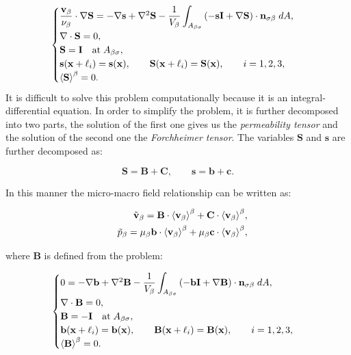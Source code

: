 \begin{eqnarray}
	\begin{cases}
		\dfrac{\textbf{v}_{\beta}}{\nu_{\beta}} \cdot  \nabla \mathbf{S} = -\nabla \mathbf{s} + \nabla^2 \mathbf{S} - \dfrac{1}{V_\beta} \displaystyle \int_{A_{\beta \sigma}} \left(-\mathbf{s}\mathbf{I}  +  \nabla \mathbf{S} \right) \cdot \mathbf{n}_{\sigma \beta} \;dA,  \\
		\nabla \cdot \mathbf{S} = 0, \\
		\mathbf{S} = \mathbf{I} \quad \textrm{at} \; A_{\beta \sigma}, \\
		\mathbf{s}(\mathbf{x} +\ell_i) = \mathbf{s}(\mathbf{x}), \qquad \mathbf{S}(\mathbf{x} +\ell_i) = \mathbf{S}(\mathbf{x}), \qquad i=1,2,3 ,\\
		{\left< \mathbf{S} \right>}^{\beta} = 0.
	\end{cases}
\label{eq:R_problem}
\end{eqnarray}
It is difficult to solve this problem computationally because it is an integral-differential equation.
In order to simplify the problem, it is further decomposed into two parts, the solution of the first one gives us the \textit{permeability tensor} and the solution of the second one the \textit{Forchheimer tensor}. The variables $\mathbf{S}$ and $\mathbf{s}$ are further decomposed as:

$$
 \mathbf{S} = \mathbf{B} + \mathbf{C}, \qquad \mathbf{s} = \mathbf{b} + \mathbf{c}.
$$

\noindent In this manner the micro-macro field relationship can be written as:

\begin{eqnarray}
	&& \tilde{\textbf{v}}_{\beta} = \mathbf{B} \cdot {\left< \textbf{v}_{\beta}\right>}^{\beta} + \mathbf{C} \cdot {\left< \textbf{v}_{\beta}\right>}^{\beta},  	\label{eq:closure_viab_divison} \\
	&& \tilde{p}_{\beta} = \mu_{\beta} \mathbf{b} \cdot {\left< \textbf{v}_{\beta}\right>}^{\beta} + \mu_{\beta} \mathbf{c} \cdot {\left< \textbf{v}_{\beta}\right>}^{\beta}, \label{eq:closure_viab_hp}
\end{eqnarray}

where $\mathbf{B}$ is defined from the problem:

\begin{eqnarray}
	\begin{cases}
		0 = -\nabla \mathbf{b} + \nabla^2 \mathbf{B} - \dfrac{1}{V_\beta} \displaystyle \int_{A_{\beta \sigma}}  \left(-\mathbf{b}\mathbf{I}  +  \nabla \mathbf{B} \right) \cdot \mathbf{n}_{\sigma \beta} \;dA,  \\
		\nabla \cdot \mathbf{B} = 0,  \\
		\mathbf{B} = -\mathbf{I} \quad \textrm{at} \; A_{\beta \sigma}, \\
		\mathbf{b}(\mathbf{x} +\ell_i) = \mathbf{b}(\mathbf{x}), \qquad \mathbf{B}(\mathbf{x} +\ell_i) = \mathbf{B}(\mathbf{x}), \qquad i=1,2,3 , \\
		{\left< \mathbf{B} \right>}^{\beta} = 0.
	\end{cases}
\label{eq:B_problem}
\end{eqnarray}

